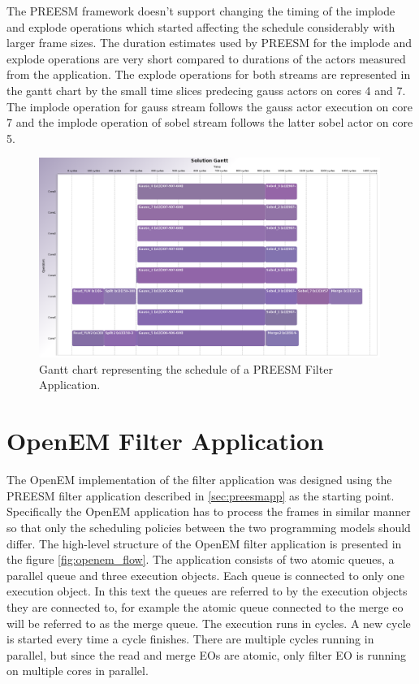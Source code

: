 The PREESM framework doesn't support changing the timing of the implode and
explode operations which started affecting the schedule considerably with larger
frame sizes. The duration estimates used by PREESM for the implode and explode
operations are very short compared to durations of the actors measured from the
application. The explode operations for both streams are represented in the
gantt chart by the small time slices predecing gauss actors on cores 4 and 7.
The implode operation for gauss stream follows the gauss actor execution on core
7 and the implode operation of sobel stream follows the latter sobel actor on
core 5.

\begin{figure}[h!]
    \begin{center}
        \includegraphics[width=0.99\textwidth]{images/gantt_preesm_cifcif.png}
        \caption{Gantt chart representing the schedule of a PREESM Filter
        Application.}
        \label{fig:preesm_gantt}
    \end{center}
\end{figure}

\section{OpenEM Filter Application}
\label{sec:oemapp}
The OpenEM implementation of the filter application was designed using the
PREESM filter application described in \ref{sec:preesmapp} as the starting
point. Specifically the OpenEM application has to process the frames in similar
manner so that only the scheduling policies between the two programming models
should differ. The high-level structure of the OpenEM filter application is
presented in the figure \ref{fig:openem_flow}. The application consists of two
atomic queues, a parallel queue and three execution objects. Each queue is
connected to only one execution object. In this text the queues are referred to
by the execution objects they are connected to, for example the atomic queue
connected to the merge eo will be referred to as the merge queue. The execution
runs in cycles. A new cycle is started every time a cycle finishes. There are
multiple cycles running in parallel, but since the read and merge EOs are
atomic, only filter EO is running on multiple cores in parallel.

